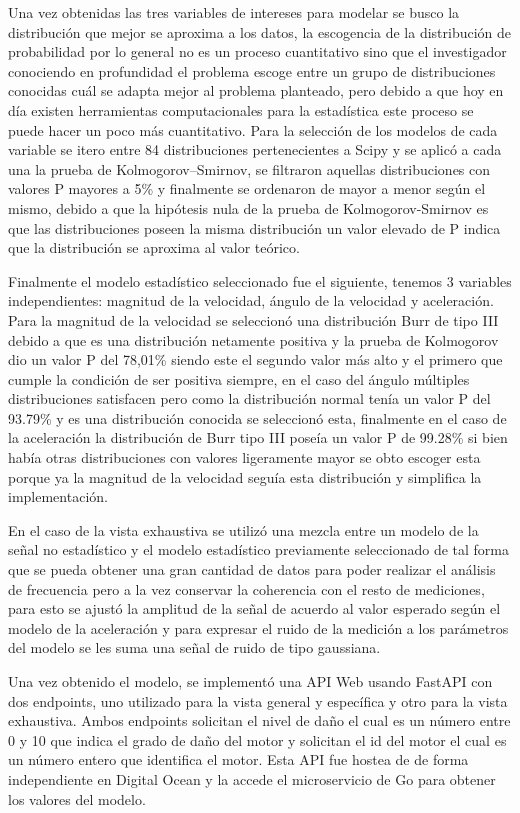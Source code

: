Una vez obtenidas las tres variables de intereses para modelar se busco la
distribución que mejor se aproxima a los datos, la escogencia de la
distribución de probabilidad por lo general no es un proceso cuantitativo sino
que el investigador conociendo en profundidad el problema escoge entre un grupo
de distribuciones conocidas cuál se adapta mejor al problema planteado, pero
debido a que hoy en día existen herramientas computacionales para la
estadística este proceso se puede hacer un poco más cuantitativo. Para la
selección de los modelos de cada variable se itero entre 84 distribuciones
pertenecientes a Scipy y se aplicó a cada una la prueba de Kolmogorov–Smirnov,
se filtraron aquellas distribuciones con valores P mayores a 5\% y finalmente se
ordenaron de mayor a menor según el mismo, debido a que la hipótesis nula de la
prueba de Kolmogorov-Smirnov es que las distribuciones poseen la misma
distribución un valor elevado de P indica que la distribución se aproxima al
valor teórico.

Finalmente el modelo estadístico seleccionado fue el siguiente, tenemos 3
variables independientes: magnitud de la velocidad, ángulo de la velocidad y
aceleración. Para la magnitud de la velocidad se seleccionó una distribución
Burr de tipo III debido a que es una distribución netamente positiva y la
prueba de Kolmogorov dio un valor P del 78,01\% siendo este el segundo valor más
alto y el primero que cumple la condición de ser positiva siempre, en el caso
del ángulo múltiples distribuciones satisfacen pero como la distribución normal
tenía un valor P del 93.79\% y es una distribución conocida se seleccionó esta,
finalmente en el caso de la aceleración la distribución de Burr tipo III poseía
un valor P de 99.28\% si bien había otras distribuciones con valores ligeramente
mayor se obto escoger esta porque ya la magnitud de la velocidad seguía esta
distribución y simplifica la implementación.

En el caso de la vista exhaustiva se utilizó una mezcla entre un modelo de la
señal no estadístico y el modelo estadístico previamente seleccionado de tal
forma que se pueda obtener una gran cantidad de datos para poder realizar el
análisis de frecuencia pero a la vez conservar la coherencia con el resto de
mediciones, para esto se ajustó la amplitud de la señal de acuerdo al valor
esperado según el modelo de la aceleración y para expresar el ruido de la
medición a los parámetros del modelo se les suma una señal de ruido de tipo
gaussiana.

Una vez obtenido el modelo, se implementó una API Web usando FastAPI con dos
endpoints, uno utilizado para la vista general y específica y otro para la
vista exhaustiva. Ambos endpoints solicitan el nivel de daño el cual es un
número entre 0 y 10 que indica el grado de daño del motor y solicitan el id del
motor el cual es un número entero  que identifica el motor. Esta API fue hostea
de de forma independiente en Digital Ocean y la accede el microservicio de Go
para obtener los valores del modelo.
